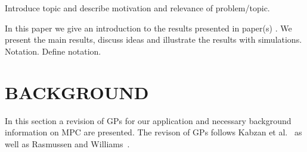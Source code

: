 \documentclass[letterpaper, 10 pt, conference]{ieeeconf}  %
\begin{document}
Introduce topic and describe motivation and relevance of problem/topic.

In this paper we give an introduction to the results presented in paper(s) \cite{Bro-14}.
We present the main results, discuss ideas and illustrate the results with simulations.\\

Notation. Define notation.

\section{BACKGROUND}
In this section a revision of GPs for our application and necessary background information on MPC are presented. The revison of GPs follows Kabzan et al.~\cite{kabzan2019learning} as well as Rasmussen and Williams~\cite{williams2006gaussian}. \\
\end{document}

